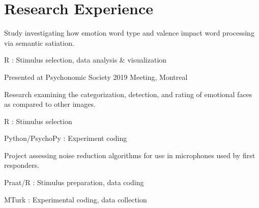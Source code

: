\documentclass[letterpaper]{deedy-resume_sm} %
\begin{document}
\section{Research Experience}
\begin{tightitemize}
\item Study investigating how emotion word type and valence impact word processing via semantic satiation.
\item R : Stimulus selection, data analysis \& visualization
\item Presented at Psychonomic Society 2019 Meeting, Montreal
\end{tightitemize}
\begin{tightitemize}
\item Research examining the categorization, detection, and rating of emotional faces as compared to other images.
\item R : Stimulus selection
\item Python/PsychoPy : Experiment coding
\end{tightitemize}
\begin{tightitemize}
\item Project assessing noise reduction algorithms for use in microphones used by first responders.
\item Praat/R : Stimulus preparation, data coding
\item MTurk : Experimental coding, data collection
\end{tightitemize}
\end{document}
